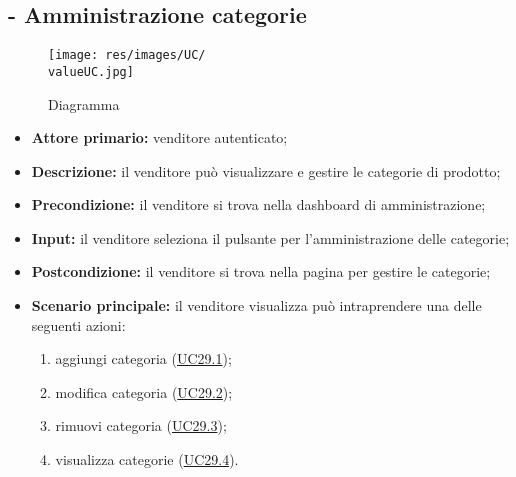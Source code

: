 \stepUserCase
\subsection{ - Amministrazione categorie}
\begin{figure}[H]
    \centering
    \texttt{[image: res/images/UC/\\valueUC.jpg]}
    \caption{Diagramma }
\end{figure}
\begin{itemize}
    \item \textbf{Attore primario:} venditore autenticato;
    \item \textbf{Descrizione:}  il venditore può visualizzare e gestire le categorie di prodotto;
    \item \textbf{Precondizione:}  il venditore si trova nella dashboard di amministrazione;
    \item \textbf{Input:} il venditore seleziona il pulsante per l'amministrazione delle categorie;
    \item \textbf{Postcondizione:} il venditore si trova nella pagina per gestire le categorie;
    \item \textbf{Scenario principale:} il venditore visualizza può intraprendere una delle seguenti azioni:
          \begin{enumerate}
              \item aggiungi categoria (\hyperref[UC29.1]{UC29.1});
              \item modifica categoria (\hyperref[UC29.2]{UC29.2});
              \item rimuovi categoria (\hyperref[UC29.3]{UC29.3});
              \item visualizza categorie (\hyperref[UC29.4]{UC29.4}).
          \end{enumerate}
\end{itemize}

\stepsubUserCase
